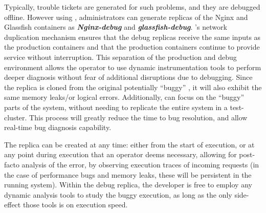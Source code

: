 Typically, trouble tickets are generated for such problems, and they are debugged offline.
However using \parikshan, administrators can generate replicas of the Nginx and Glassfish containers as \textbf{\textit{Nginx-debug}} and \textbf{\textit{glassfish-debug}}.
\parikshan's network duplication mechanism ensures that the debug replicas receive the same inputs as the production containers and that the production containers continue to provide service without interruption.
This separation of the production and debug environment allows the operator to use dynamic instrumentation tools to perform deeper diagnosis without fear of additional disruptions due to debugging.
Since the replica is cloned from the original potentially ``buggy'' \productioncontainer, it will also exhibit the same memory leaks/or logical errors.
Additionally, \parikshan can focus on the ``buggy'' parts of the system, without needing to replicate the entire system in a test-cluster.
This process will greatly reduce the time to bug resolution, and allow real-time bug diagnosis capability.

The replica can be created at any time: either from the start of execution, or at any point during execution that an operator deems necessary, allowing for post-facto analysis of the error, by observing execution traces of incoming requests (in the case of performance bugs and memory leaks, these will be persistent in the running system).
Within the debug replica, the developer is free to employ any dynamic analysis tools to study the buggy execution, as long as the only side-effect those tools is on execution speed.
